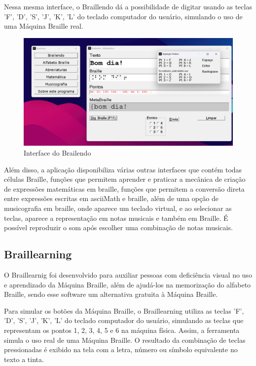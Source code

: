 Nessa mesma interface, o Braillendo dá a possibilidade de digitar usando as teclas 'F', 'D', 'S', 'J', 'K', 'L' do teclado computador do usuário, simulando o uso de uma Máquina Braille real.

\begin{figure}[h]
    \centering
    \includegraphics[scale=0.3]{ch02/assets/brailendo-gui.png}
    \decoRule
    \caption[Interface do Brailendo]{Interface do Brailendo}
    \label{fig:ch02-brailendo-gui}
\end{figure}

Além disso, a aplicação disponibiliza várias outras interfaces que contém todas células Braille, funções que permitem aprender e praticar a mecânica de criação de expressões matemáticas em braille, funções que permitem a conversão direta entre expressões escritas em asciiMath e braille, além de uma opção de musicografia em braille, onde aparece um teclado virtual, e ao selecionar as teclas, aparece a representação em notas musicais e também em Braille. É possível reproduzir o som após escolher uma combinação de notas musicais.

\subsection{Braillearning}

O Braillearnig \parencite{REF08} foi desenvolvido para auxiliar pessoas com deficiência visual no uso e aprendizado da Máquina Braille, além de ajudá-los na memorização do alfabeto Braille, sendo esse software um alternativa gratuita à Máquina Braille.

Para simular os botões da Máquina Braille, o Braillearning utiliza as teclas 'F', 'D', 'S', 'J', 'K', 'L' do teclado computador do usuário, simulando as teclas que representam os pontos 1, 2, 3, 4, 5 e 6 na máquina física. Assim, a ferramenta simula o uso real de uma Máquina Braille. O resultado da combinação de teclas pressionadas é exibido na tela com a letra, número ou símbolo equivalente no texto a tinta.

